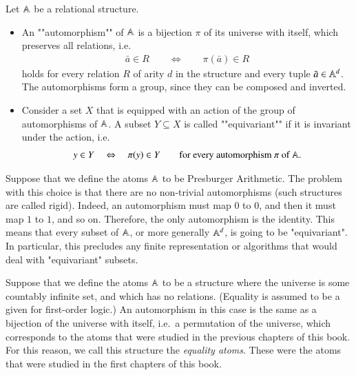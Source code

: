\begin{definition}
	Let $\mathbb A$ be a relational structure. 
	\begin{itemize}
		\item     An ""automorphism"" of $\mathbb A$ is a bijection $\pi$ of its universe with itself, which  preserves all relations, i.e.
    \begin{align*}
        \bar a \in R \qquad \Leftrightarrow \qquad \pi(\bar a) \in R
    \end{align*}
    holds for every relation $R$ of arity $d$ in the structure and every tuple $\bar a \in \mathbb A^d$. The automorphisms form a group, since they can be composed and inverted.
	\item Consider a set $X$ that is equipped with an action of the group of automorphisms of $\mathbb A$. A subset $Y \subseteq X$ is called ""equivariant"" if it is invariant under the action, i.e.
	\begin{align*}
	y \in Y \quad \Leftrightarrow \quad \pi(y) \in Y \qquad \text{for every automorphism $\pi$ of $\mathbb A$}.
	\end{align*}
	\end{itemize}
\end{definition}

\begin{myexample}\label{ex:presburger-rigid}
	Suppose that we define the atoms $\mathbb A$ to be  Presburger Arithmetic. The problem with this choice is that there are  no  non-trivial automorphisms (such structures are called rigid). Indeed, an automorphism must map $0$ to $0$, and then it must map $1$ to $1$, and so on. Therefore, the only automorphism is the identity.	This means that every subset of $\mathbb A$, or more generally $\mathbb A^d$,  is going to be "equivariant". In particular, this precludes any finite representation or algorithms that would deal with "equivariant" subsets. 
\end{myexample}
\begin{myexample}\label{ex:equality-atoms}
	Suppose that we define the atoms $\mathbb A$ to be a structure  where the universe is some countably infinite set, and which has no relations. (Equality is assumed to be a given for first-order logic.) An automorphism in this case is the same as a bijection of the universe with itself, i.e.~a permutation of the universe, which corresponds to the atoms that were studied in the previous chapters of this book. For this reason, we call this structure the \emph{equality atoms}.  These were the atoms that were studied in the first chapters of this book.
\end{myexample}

